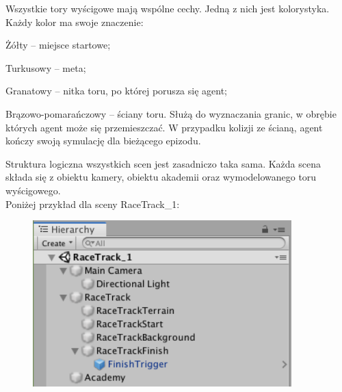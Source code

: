 Wszystkie tory wyścigowe mają wspólne cechy. Jedną z nich jest kolorystyka. Każdy kolor ma swoje znaczenie:
\begin{itemize*}
\item Żółty -- miejsce startowe;
\item Turkusowy -- meta;
\item Granatowy -- nitka toru, po której porusza się agent;
\item Brązowo-pomarańczowy -- ściany toru. Służą do wyznaczania granic, w obrębie których agent może się przemieszczać. W przypadku kolizji ze ścianą, agent kończy swoją symulację dla bieżącego epizodu.
\end{itemize*}

Struktura logiczna wszystkich scen jest zasadniczo taka sama. Każda scena składa się z obiektu kamery, obiektu akademii oraz wymodelowanego toru wyścigowego. \\
Poniżej przykład dla sceny RaceTrack\_1:
\vspace{0.5cm}
\begin{figure}[H]
\centering
\includegraphics[width=10cm]{resources/figures/scene_structure.png}
\end{figure}

